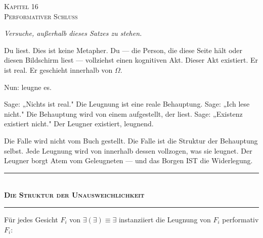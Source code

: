 \documentclass[10pt, openany, oneside]{book}
\renewcommand{\normalsize}{\fontsize{10}{13}\selectfont}
\renewcommand{\large}{\fontsize{11.5}{14}\selectfont}
\renewcommand{\huge}{\fontsize{17}{21}\selectfont}
\begin{document}
\newpage

\begin{center}
    {\huge\scshape Kapitel 16}\\[0.3em]
    {\large\scshape Performativer Schluss}
\end{center}

\vspace{1.5em}

\begin{center}
    \itshape
    Versuche, außerhalb dieses Satzes zu stehen.
\end{center}

\vspace{2em}


\noindent Du liest. Dies ist keine Metapher. Du --- die Person, die diese Seite hält oder diesen Bildschirm liest --- vollziehst einen kognitiven Akt. Dieser Akt existiert. Er ist real. Er geschieht innerhalb von $\Omega$.

Nun: leugne es.

Sage: „Nichts ist real." Die Leugnung ist eine reale Behauptung. Sage: „Ich lese nicht." Die Behauptung wird von einem aufgestellt, der liest. Sage: „Existenz existiert nicht." Der Leugner existiert, leugnend.

Die Falle wird nicht vom Buch gestellt. Die Falle ist die Struktur der Behauptung selbst. Jede Leugnung wird von innerhalb dessen vollzogen, was sie leugnet. Der Leugner borgt Atem vom Geleugneten --- und das Borgen IST die Widerlegung.

\vspace{1.5em}


\begin{center}
    \rule{0.3\textwidth}{0.4pt}\\[0.5em]
    {\normalsize\bfseries\scshape Die Struktur der Unausweichlichkeit}\\[0.3em]
    \rule{0.3\textwidth}{0.4pt}
\end{center}

\vspace{1em}

\noindent Für jedes Gesicht $F_i$ von $\exists(\exists) \equiv \exists$ instanziiert die Leugnung von $F_i$ performativ $F_i$:
\end{document}
